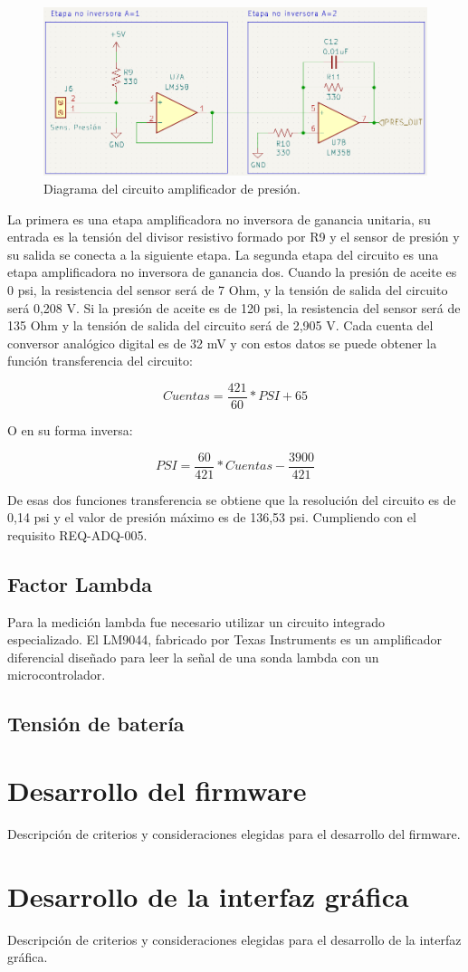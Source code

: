 \begin{figure}[htpb]
\centering
\includegraphics[width=.9\textwidth]{./Figures/circuito-presion.png}
\caption{Diagrama del circuito amplificador de presión.}
\label{fig:circuito-presion}
\end{figure}

La primera es una etapa amplificadora no inversora de ganancia unitaria, su entrada es la tensión del divisor resistivo formado por R9 y el sensor de presión y su salida se conecta a la siguiente etapa. La segunda etapa del circuito es una etapa amplificadora no inversora de ganancia dos.
Cuando la presión de aceite es 0 psi, la resistencia del sensor será de 7 Ohm, y la tensión de salida del circuito será 0,208 V. Si la presión de aceite es de 120 psi, la resistencia del sensor será de 135 Ohm y la tensión de salida del circuito será de 2,905 V. Cada cuenta del conversor analógico digital es de 32 mV y con estos datos se puede obtener la función transferencia del circuito:

\[ Cuentas = \frac{421}{60} * PSI + 65\]

O en su forma inversa:

\[ PSI = \frac{60}{421} * Cuentas - \frac{3900}{421} \]

De esas dos funciones transferencia se obtiene que la resolución del circuito es de 0,14 psi y el valor de presión máximo es de 136,53 psi. Cumpliendo con el requisito REQ-ADQ-005.

\subsection{Factor Lambda}

Para la medición lambda fue necesario utilizar un circuito integrado especializado. El LM9044, fabricado por Texas Instruments es un amplificador diferencial diseñado para leer la señal de una sonda lambda con un microcontrolador. 

\subsection{Tensión de batería}

\section{Desarrollo del firmware}

Descripción de criterios y consideraciones elegidas para el desarrollo del firmware.

\section{Desarrollo de la interfaz gráfica}

Descripción de criterios y consideraciones elegidas para el desarrollo de la interfaz gráfica.

